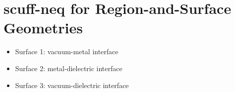 \documentclass[letterpaper]{article}
\begin{document}


\newpage
\section{{\sc scuff-neq} for Region-and-Surface Geometries}

\begin{itemize}
 \item Surface 1: vacuum-metal interface
 \item Surface 2: metal-dielectric interface
 \item Surface 3: vacuum-dielectric interface
\end{itemize}
\end{document}
